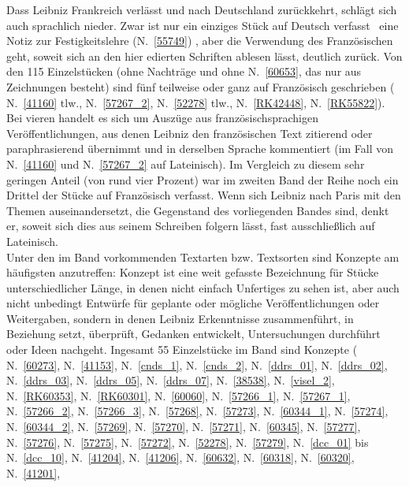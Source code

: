 Dass Leibniz Frankreich verlässt und nach Deutschland zurückkehrt, schlägt sich auch sprachlich nieder. Zwar ist nur ein einziges Stück auf Deutsch verfasst \textendash\ eine Notiz zur Festigkeitslehre (N.~\ref{55749}) \textendash, aber die Verwendung des Französischen geht, soweit sich an den hier edierten Schriften ablesen lässt, deutlich zurück.
Von den 115 Einzelstücken (ohne Nachträge und ohne N.~\ref{60653}, das nur aus Zeichnungen besteht) sind fünf teilweise oder ganz auf Französisch geschrieben (%
N.~\ref{41160} tlw.,
N.~\ref{57267_2},
N.~\ref{52278} tlw.,
N.~\ref{RK42448},
N.~\ref{RK55822}). Bei vieren handelt es sich um Auszüge aus französischsprachigen Veröffentlichungen, aus denen Leibniz den französischen Text zitierend oder paraphrasierend übernimmt und in derselben Sprache kommentiert (im Fall von N.~\ref{41160} und N.~\ref{57267_2} auf Lateinisch). Im Vergleich zu diesem sehr geringen Anteil (von rund vier Prozent) war im zweiten Band der Reihe noch ein Drittel der Stücke auf Französisch verfasst. 
Wenn sich Leibniz nach Paris mit den Themen auseinandersetzt, die Gegenstand des vorliegenden Bandes sind, denkt er, soweit sich dies aus seinem Schreiben folgern lässt, fast ausschließlich auf Lateinisch.
\\ \indent
Unter den im Band vorkommenden Textarten bzw. Textsorten sind Konzepte am häufigsten anzutreffen: Konzept ist eine weit gefasste Bezeichnung für Stücke unterschiedlicher Länge, in denen nicht einfach Unfertiges zu sehen ist, aber auch nicht unbedingt Entwürfe für geplante oder mögliche Veröffentlichungen oder Weitergaben, sondern in denen Leibniz Erkenntnisse zusammenführt, in Beziehung setzt, überprüft, Gedanken entwickelt, Untersuchungen durchführt oder Ideen nachgeht. Ingesamt 55 Einzelstücke im Band sind Konzepte (%
N.~\ref{60273},
N.~\ref{41153},
N.~\ref{cnds_1},
N.~\ref{cnds_2},
N.~\ref{ddrs_01},
N.~\ref{ddrs_02},
N.~\ref{ddrs_03},
N.~\ref{ddrs_05},
N.~\ref{ddrs_07},
N.~\ref{38538},
N.~\ref{visel_2},
N.~\ref{RK60353},
N.~\ref{RK60301},
N.~\ref{60060},
N.~\ref{57266_1},
N.~\ref{57267_1},
N.~\ref{57266_2},
N.~\ref{57266_3},
N.~\ref{57268},
N.~\ref{57273},
N.~\ref{60344_1},
N.~\ref{57274},
N.~\ref{60344_2},
N.~\ref{57269},
N.~\ref{57270},
N.~\ref{57271},
N.~\ref{60345},
N.~\ref{57277},
N.~\ref{57276},
N.~\ref{57275},
N.~\ref{57272},
N.~\ref{52278},
N.~\ref{57279},
N.~\ref{dcc_01} bis N.~\ref{dcc_10},
N.~\ref{41204},
N.~\ref{41206},
N.~\ref{60632},
N.~\ref{60318},
N.~\ref{60320},
N.~\ref{41201},
